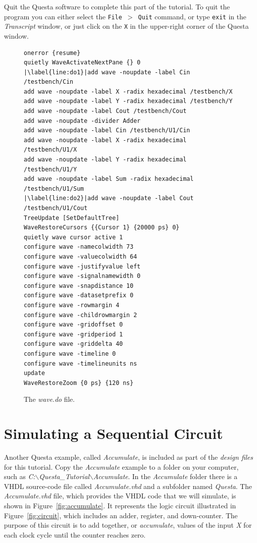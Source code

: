 \documentclass[11pt, twoside, pdftex]{article}
\begin{document}
\noindent
Quit the Questa software to complete this part of the tutorial. To quit the program you 
can either select the \texttt{File}~$>$~\texttt{Quit} command, or 
type \texttt{exit} in the {\it Transcript}
window, or just click on the \texttt{X} in the upper-right corner of the Questa window.

\lstset{numbers=left,escapechar=|}
\begin{figure}[h!]
\begin{center}
\begin{minipage}[h!]{14.5 cm}
\begin{lstlisting}[name=do]
onerror {resume}
quietly WaveActivateNextPane {} 0
|\label{line:do1}|add wave -noupdate -label Cin /testbench/Cin
add wave -noupdate -label X -radix hexadecimal /testbench/X
add wave -noupdate -label Y -radix hexadecimal /testbench/Y
add wave -noupdate -label Cout /testbench/Cout
add wave -noupdate -divider Adder
add wave -noupdate -label Cin /testbench/U1/Cin
add wave -noupdate -label X -radix hexadecimal /testbench/U1/X
add wave -noupdate -label Y -radix hexadecimal /testbench/U1/Y
add wave -noupdate -label Sum -radix hexadecimal /testbench/U1/Sum
|\label{line:do2}|add wave -noupdate -label Cout /testbench/U1/Cout
TreeUpdate [SetDefaultTree]
WaveRestoreCursors {{Cursor 1} {20000 ps} 0}
quietly wave cursor active 1
configure wave -namecolwidth 73
configure wave -valuecolwidth 64
configure wave -justifyvalue left
configure wave -signalnamewidth 0
configure wave -snapdistance 10
configure wave -datasetprefix 0
configure wave -rowmargin 4
configure wave -childrowmargin 2
configure wave -gridoffset 0
configure wave -gridperiod 1
configure wave -griddelta 40
configure wave -timeline 0
configure wave -timelineunits ns
update
WaveRestoreZoom {0 ps} {120 ns}
\end{lstlisting}
\end{minipage}
\caption{The {\it wave.do} file.}
\label{fig:do}
\end{center}
\end{figure}

\section{Simulating a Sequential Circuit}

Another Questa example, called {\it Accumulate}, is included as part of the
{\it design files} for this tutorial. Copy the {\it Accumulate} example to 
a folder on your computer, such as 
{\it C:$\backslash$Questa\_Tutorial$\backslash$Accumulate}. In the {\it Accumulate} folder
there is a VHDL source-code file called {\it Accumulate.vhd} and a subfolder named 
{\it Questa}. The {\it Accumulate.vhd} file, which provides the VHDL code that we will 
simulate, is shown in Figure~\ref{fig:accumulate}. It
represents the logic circuit illustrated in Figure~\ref{fig:circuit}, which includes an
adder, register, and down-counter. The purpose of this circuit is to add together, or
{\it accumulate}, values of the input {\it X} for each clock cycle until the counter 
reaches zero. 
\end{document}
